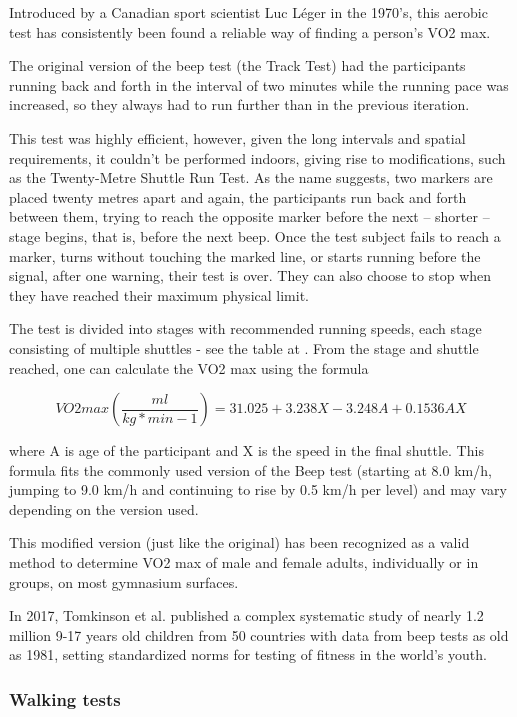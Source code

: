 Introduced by a Canadian sport scientist Luc Léger in the 1970's, this aerobic test has consistently been found a reliable way of finding a person's VO2 max.

The original version of the beep test (the Track Test) had the participants running back and forth in the interval of two minutes while the running pace was increased, so they always had to run further than in the previous iteration.

This test was highly efficient, however, given the long intervals and spatial requirements, it couldn't be performed indoors, giving rise to modifications, such as the Twenty-Metre Shuttle Run Test.
As the name suggests, two markers are placed twenty metres apart and again, the participants run back and forth between them, trying to reach the opposite marker before the next -- shorter -- stage begins, that is, before the next beep.
Once the test subject fails to reach a marker, turns without touching the marked line, or starts running before the signal, after one warning, their test is over.
They can also choose to stop when they have reached their maximum physical limit.

The test is divided into stages with recommended running speeds, each stage consisting of multiple shuttles - see the table at \cite{beep-test-scoring-table}.
From the stage and shuttle reached, one can calculate the VO2 max using the formula

\[VO2max (\frac{ml}{kg*min-1}) = 31.025 + 3.238X - 3.248A + 0.1536AX\]

where A is age of the participant and X is the speed in the final shuttle.
This formula fits the commonly used version of the Beep test (starting at 8.0 km/h, jumping to 9.0 km/h and continuing to rise by 0.5 km/h per level) and may vary depending on the version used.\cite{beep-test-versions}\cite{beep-test-20m-valid}

This modified version (just like the original) has been recognized as a valid method to determine VO2 max of male and female adults, individually or in groups, on most gymnasium surfaces.\cite{beep-test-20m-valid}

In 2017, Tomkinson et al. published a complex systematic study of nearly 1.2 million 9-17 years old children from 50 countries with data from beep tests as old as 1981,
setting standardized norms for testing of fitness in the world's youth.\cite{beep-test-youth-large-study}


\subsubsection*{Walking tests}

